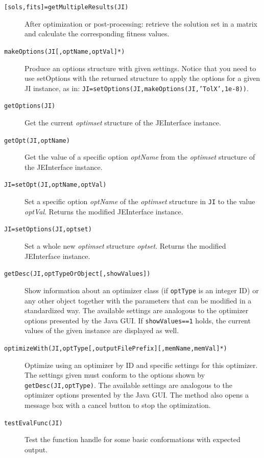 \begin{description}
	\item [{\texttt{{[}sols,fits{]}=getMultipleResults(JI)}}] After optimization
or post-processing: retrieve the solution set in a matrix and calculate
the corresponding fitness values.

	\item [{\texttt{makeOptions(JI{[},optName,optVal{]}{*})}}] Produce an options
structure with given settings. Notice that you need to use setOptions
with the returned structure to apply the options for a given JI instance,
as in: \texttt{JI=setOptions(JI,makeOptions(JI,'TolX',1e-8))}. 

	\item [{\texttt{getOptions(JI)}}] Get the current \emph{optimset} structure
of the JEInterface instance.

	\item [{\texttt{getOpt(JI,optName)}}] Get the value of a specific option
\emph{optName} from the \emph{optimset} structure of the JEInterface
instance.

	\item [{\texttt{JI=setOpt(JI,optName,optVal)}}] Set a specific option \emph{optName}
of the \emph{optimset} structure in \texttt{JI} to the value \emph{optVal}.
Returns the modified JEInterface instance.

	\item [{\texttt{JI=setOptions(JI,optset)}}] Set a whole new \emph{optimset}
structure \emph{optset}. Returns the modified JEInterface instance.

	\item [{\texttt{getDesc(JI,optTypeOrObject{[},showValues{]})}}] Show information
about an optimizer class (if \texttt{optType} is an integer ID) or
any other object together with the parameters that can be modified
in a standardized way. The available settings are analogous to the
optimizer options presented by the Java GUI. If \texttt{showValues==1}
holds, the current values of the given instance are displayed as well.

	\item [{\texttt{optimizeWith(JI,optType{[},outputFilePrefix{]}{[},memName,memVal{]}{*})}}] Optimize
using an optimizer by ID and specific settings for this optimizer.
The settings given must conform to the options shown by \texttt{getDesc(JI,optType)}.
The available settings are analogous to the optimizer options presented
by the Java GUI. The method also opens a message box with a cancel
button to stop the optimization.

	\item [{\texttt{testEvalFunc(JI)}}] Test the function handle for some basic
conformations with expected output.


\end{description}

